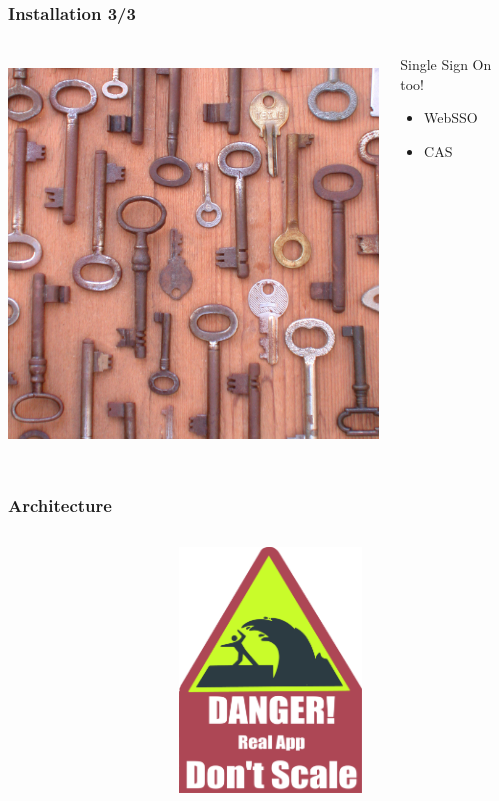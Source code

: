 \documentclass{beamer}
\begin{document}
\begin{frame}
    \frametitle{Installation 3/3}


 \begin{columns}
 \begin{column}{0.34\textwidth}
    \includegraphics[height=10.5cm]{pics/sso.jpg}
 \end{column}
 \begin{column}{0.90\textwidth}
    \begin{block}{Single Sign On too!}
        \begin{itemize}
            \item WebSSO
            \item CAS
        \end{itemize}
    \end{block}
 \end{column}
\end{columns}

\end{frame}

\begin{frame}
    \frametitle{Architecture}

 \begin{columns}
 \begin{column}{0.34\textwidth}
 \end{column}
 \begin{column}{0.90\textwidth}
    \includegraphics[height=6.5cm]{pics/scale.pdf}
 \end{column}
\end{columns}

\end{frame}
\end{document}
